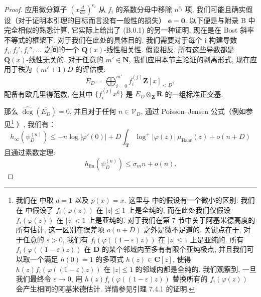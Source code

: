 \begin{proof}
应用微分算子 \(\left(x\frac{d}{dx}\right)^{e_i}\) 从 \(f_i\) 的系数分母中移除 \(n^{e_i}\) 项, 
我们可能且确实假设（对于证明本引理的目标而言没有一般性的损失） \(\mathbf{e} = \mathbf{0}\). 
以下便是与附录 B 中完全相似的熟悉计算, 
它实际上给出了 (B.0.1) 的另一种证明, 现在是在 Bost 斜率不等式的框架下. 
对于我们在此处的具体目的, 我们需要对于每个 i 构建导数 \(f_i, f_i', f_i'', \ldots\) 之间的一个 \(\mathbf{Q}(x)\)-线性相关性. 
假设相反, 所有这些导数都是 \(\mathbf{Q}(x)\)-线性无关的. 
对于任意的 \(m' \in \mathbf{N}\), 我们应用本节主论证的剥离形式, 
现在应用于秩为 \((m'+1)D\) 的评估模:
\[ E_D = \bigoplus_{i=0}^{m'} f_i^{(j)} \mathbf{Z}[x]_{< D}, \]
配备有欧几里得范数, 在其中 \(\{f_i^{(j)}x^k\}\) 是 \(E_D \otimes_{\mathbf{Z}} \mathbf{R}\) 的一组标准正交基.

那么 \(\widehat{\operatorname{deg}}(\overline{E_D}) = 0\), 并且对于任何 \(n \in \mathcal{V}_D\), 
通过 Poisson--Jensen 公式（例如参见\footnote{我们在 \cite{CDT21} 中取 \(d=1\) 以及 \(p(x)=x\). 这里与 \cite{CDT21} 中的假设有一个微小的区别: 我们在 \cite{CDT21} 中假设了 \(f_i(\varphi(z))\) 在 \(|z|\leq 1\) 上是全纯的, 而在此处我们仅假设 \(f_i(\varphi(z))\) 在 \(|z|<1\) 上是亚纯的. 对于我们在第 7 节中关于阿基米德高度的所有估计, 这一区别在误差项 \(o(n+D)\) 之外是微不足道的. 关键点在于, 对于任意的 \(\varepsilon>0\), 我们有 \(f_i(\varphi((1-\varepsilon)z))\) 在 \(|z|\leq 1\) 上是亚纯的. 所有 \(f_i(\varphi((1-\varepsilon)z))\) 在 \(\overline{\mathbf{D}}\) 的某个邻域内至多有有限个亚纯极点, 并且我们可以取一个满足 \(h(0)=1\) 的多项式 \(h(z)\in \mathbf{C}[z]\), 使得 \(h(z)f_i(\varphi((1-\varepsilon)z))\) 在 \(|z|\leq 1\) 的邻域内都是全纯的. 我们观察到, 一旦我们最终令 \(\varepsilon\to 0\), 用 \(h(z)f_i(\varphi((1-\varepsilon)z))\) 替换所有的 \(f_i(\varphi(z))\) 会产生相同的阿基米德估计. 详情参见引理 7.4.1 的证明.} \cite[第 2.4 节]{CDT21}）, 我们有：
\[ h_{\infty}(\psi_D^{(n)}) \le -n\log|\varphi'(0)| + D\int_{\mathbf{T}}\log^+|\varphi(z)|\,\mu_{\mathrm{Haar}}(z) + o(n+D) \]
且通过素数定理:
\[ h_{\text{fin}}(\psi_D^{(n)}) \le \sigma_m n + o(n). \]


\end{proof}
